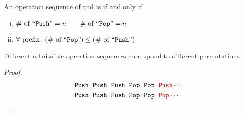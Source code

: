 \begin{frame}{}
  \begin{definition}
    An operation sequence of  and  is  if and only if
    \begin{enumerate}[(i)]
      \pause
      \item $\# \text{ of ``\texttt{Push}''} = n \qquad \# \text{ of ``\texttt{Pop}''} = n$
      \pause
      \item $\forall \text{ prefix}: (\# \text{ of ``\texttt{Pop}''}) \le (\# \text{ of ``\texttt{Push}''})$
    \end{enumerate}
  \end{definition}

  \vspace{0.50cm}
  \pause
  \begin{center}
  \end{center}
\end{frame}

\begin{frame}{}
  \begin{theorem}
    Different admissible operation sequences correspond to different permutations.
  \end{theorem}

  \vspace{0.30cm}
  \pause
  \begin{proof}
    \begin{align*}
      &\texttt{Push}{}\; \;\texttt{Push}{}\; \;\texttt{Push}{}\; \;\texttt{Pop}{}\; \;\texttt{Pop}{}\; \;\textcolor{red}{\texttt{Push}{}} \cdots \\
      &\texttt{Push}{}\; \;\texttt{Push}{}\; \;\texttt{Push}{}\; \;\texttt{Pop}{}\; \;\texttt{Pop}{}\; \;\textcolor{red}{\texttt{Pop}{}} \cdots \\
    \end{align*}
  \end{proof}
\end{frame}

